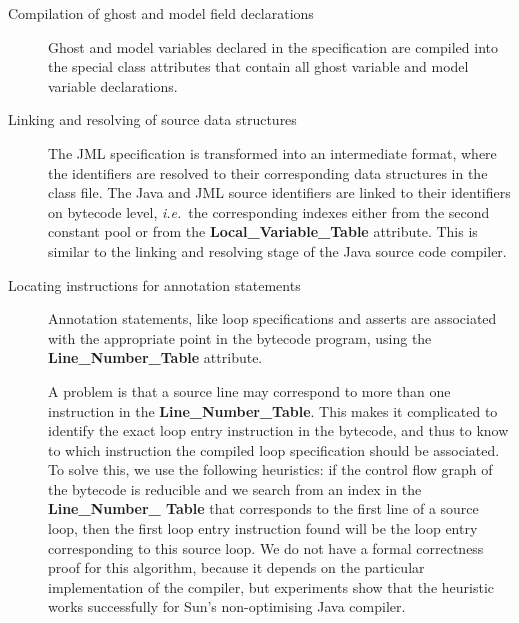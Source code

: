 \begin{description}

\item[Compilation of ghost and model field declarations] 
Ghost and model variables declared in the specification are
compiled into the special class attributes that contain all ghost
variable and model variable declarations. 


\item[Linking and resolving of source data structures]
The JML specification is transformed into an intermediate format,
where the identifiers are resolved to their corresponding data
structures in the class file.  The Java and JML source identifiers are
linked to their identifiers on bytecode level, \emph{i.e.}\ the
corresponding indexes either from the second constant pool or from the
\textbf{Local\_Variable\_Table} attribute. This is similar to the
linking and resolving stage of the Java source code compiler.

\item[Locating instructions for annotation statements] 
Annotation statements, like loop specifications and asserts are
associated with the appropriate point in the bytecode program, using
the \textbf{Line\_Number\_Table} attribute.

A problem is that a source line may correspond to more than one
instruction in the \textbf{Line\_Number\_Table}. This makes it
complicated to identify the exact loop entry instruction in the
bytecode, and thus to know to which instruction the compiled loop
specification should be associated. To solve this, we use the
following heuristics: if the control flow graph of the bytecode is
reducible and we search from an index in the \textbf{Line\_Number\_
Table} that corresponds to the first line of a source loop, then the
first loop entry instruction found will be the loop entry
corresponding to this source loop.  We do not have a formal
correctness proof for this algorithm, because it depends on the
particular implementation of the compiler, but experiments show that
the heuristic works successfully for Sun's non-optimising Java
compiler.
 

\end{description}
